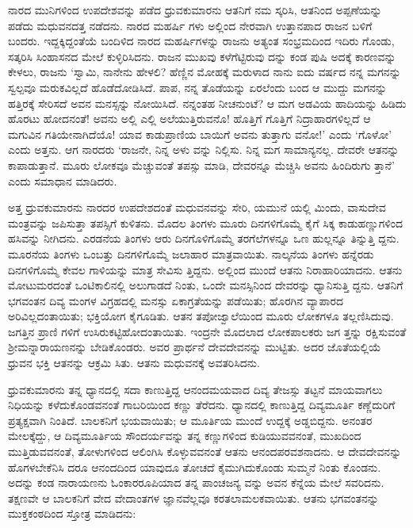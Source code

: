 ನಾರದ ಮುನಿಗಳಿಂದ ಉಪದೇಶವನ್ನು ಪಡೆದ ಧ್ರುವಕುಮಾರನು ಆತನಿಗೆ ನಮ ಸ್ಕರಿಸಿ, ಆತನಿಂದ ಅಪ್ಪಣೆಯನ್ನು ಪಡೆದು ಮಧುವನದತ್ತ ನಡೆದನು. ನಾರದ ಮಹರ್ಷಿ ಗಳು ಅಲ್ಲಿಂದ ನೇರವಾಗಿ ಉತ್ತಾನಪಾದ ರಾಜನ ಬಳಿಗೆ ಬಂದರು. ಇದ್ದಕ್ಕಿದ್ದಂತೆಯೆ ಬಂದಿಳಿದ ನಾರದ ಮಹರ್ಷಿಗಳನ್ನು ರಾಜನು ಅತ್ಯಂತ ಸಂಭ್ರಮದಿಂದ ಇದಿರು ಗೊಂಡು, ಸತ್ಕರಿಸಿ ಸಿಂಹಾಸನದ ಮೇಲೆ ಕುಳ್ಳಿರಿಸಿದನು. ರಾಜನ ಮುಖವು ಕಳೆಗೆಟ್ಟಿರುವು ದನ್ನು ಕಂಡ ಪುಷಿ ಅದಕ್ಕೆ ಕಾರಣವನ್ನು ಕೇಳಲು, ರಾಜನು ‘ಸ್ವಾಮಿ, ನಾನೇನು ಹೇಳಲಿ? ಹೆಣ್ಣಿನ ಮೋಹಕ್ಕೆ ಮರುಳಾದ ನಾನು ಐದು ವರ್ಷದ ನನ್ನ ಮಗನನ್ನು ಸ್ವಲ್ಪವೂ ಮರುಕವಿಲ್ಲದೆ ಹೊಡೆದೋಡಿಸಿದೆ. ಪಾಪ, ನನ್ನ ತೊಡೆಯನ್ನು ಏರಲೆಂದು ಬಂದ ಆ ಮುದ್ದು ಮಗನನ್ನು ಹತ್ತಿರಕ್ಕೆ ಸೇರಿಸದೆ ಅವನ ಮನಸ್ಸನ್ನು ನೋಯಿಸಿದೆ. ನನ್ನಂತಹ ನೀಚನುಂಟೆ? ಆ ಮಗ ಅಡವಿಯ ಹಾದಿಯನ್ನು ಹಿಡಿದು ಹೊರಟು ಹೋದನಂತೆ! ಅವನು ಅಲ್ಲಿ ಎಲ್ಲಿ ಅಲೆಯುತ್ತಿರುವನೊ! ಹೊತ್ತಿಗೆ ಗೊತ್ತಿಗೆ ನಿದ್ರಾಹಾರಗಳಿಲ್ಲದೆ ಆ ಮಗುವಿನ ಗತಿಯೇನಾಗಿದೆಯೊ! ಯಾವ ಕಾಡುಪ್ರಾಣಿಯ ಬಾಯಿಗೆ ಅವನು ತುತ್ತಾಗು ವನೋ!’ ಎಂದು ‘ಗೊಳೋ’ ಎಂದು ಅತ್ತನು. ಆಗ ನಾರದರು ‘ರಾಜನೇ, ನಿನ್ನ ಅಳು ವನ್ನು ನಿಲ್ಲಿಸು. ನಿನ್ನ ಮಗ ಸಾಮಾನ್ಯನಲ್ಲ. ದೇವರೇ ಆತನನ್ನು ಕಾಪಾಡುತ್ತಾನೆ. ಮೂರು ಲೋಕವೂ ಮೆಚ್ಚುವಂತೆ ತಪಸ್ಸು ಮಾಡಿ, ದೇವರನ್ನೂ ಮೆಚ್ಚಿಸಿ ಅವನು ಹಿಂದಿರುಗು ತ್ತಾನೆ’ ಎಂದು ಸಮಾಧಾನ ಮಾಡಿದರು.

ಅತ್ತ ಧ್ರುವಕುಮಾರನು ನಾರದರ ಉಪದೇಶದಂತೆ ಮಧುವನವನ್ನು ಸೇರಿ, ಯಮುನೆ ಯಲ್ಲಿ ಮಿಂದು, ವಾಸುದೇವ ಮಂತ್ರವನ್ನು ಜಪಿಸುತ್ತಾ ತಪಸ್ಸಿಗೆ ಕುಳಿತನು. ಮೊದಲ ತಿಂಗಳು ಮೂರು ದಿನಗಳಿಗೊಮ್ಮೆ ಕೈಗೆ ಸಿಕ್ಕ ಕಾಡುಹಣ್ಣುಗಳಿಂದ ಹಸಿವನ್ನು ನೀಗಿದನು. ಎರಡನೆಯ ತಿಂಗಳು ಆರು ದಿನಗೊಳಿಗೊಮ್ಮೆ ತರಗೆಲೆಗಳನ್ನೂ ಒಣ ಹುಲ್ಲನ್ನೂ ತಿನ್ನುತ್ತಿ ದ್ದನು. ಮೂರನೆಯ ತಿಂಗಳು ಒಂಬತ್ತು ದಿನಗಳಿಗೊಮ್ಮೆ ಜಲಾಹಾರ ಮಾತ್ರವಾಯಿತು. ನಾಲ್ಕನೆಯ ತಿಂಗಳು ಹನ್ನೆರಡು ದಿನಗಳಿಗೊಮ್ಮೆ ಕೇವಲ ಗಾಳಿಯನ್ನು ಮಾತ್ರ ಸೇವಿಸು ತ್ತಿದ್ದನು. ಅಲ್ಲಿಂದ ಮುಂದೆ ಆತನು ನಿರಾಹಾರಿಯಾದನು. ಆತನು ಮೋಟುಮರದಂತೆ ಒಂಟಿಕಾಲಿನಲ್ಲಿ ಅಲುಗಾಡದೆ ನಿಂತು, ಒಂದೇ ಮನಸ್ಸಿನಿಂದ ದೇವರನ್ನು ಧ್ಯಾನಿಸುತ್ತಿ ದ್ದನು. ಆತನಿಗೆ ಭಗವಂತನ ದಿವ್ಯ ಮಂಗಳ ವಿಗ್ರಹದಲ್ಲಿ ಮನಸ್ಸು ಏಕಾಗ್ರತೆಯನ್ನು ಪಡೆಯಿತು; ಹೊರಗಿನ ವ್ಯಾಪಾರದ ಅರಿವಿಲ್ಲದಂತಾಯಿತು; ಭಕ್ತಿಯೋಗ ಕೈಗೂಡಿತು. ಆತನ ತಪೋಜ್ವಾಲೆಯಿಂದ ಮೂರು ಲೋಕಗಳೂ ತಲ್ಲಣಿಸಿದುವು. ಜಗತ್ತಿನ ಪ್ರಾಣಿ ಗಳಿಗೆ ಉಸಿರುಕಟ್ಟಿಹೋದಂತಾಯಿತು. ಇಂದ್ರನೇ ಮೊದಲಾದ ಲೋಕಪಾಲಕರು ಜಗ ತ್ತನ್ನು ರಕ್ಷಿಸುವಂತೆ ಶ್ರೀಮನ್ನಾರಾಯಣನನ್ನು ಬೇಡಿಕೊಂಡರು. ಅವರ ಪ್ರಾರ್ಥನೆ ದೇವದೇವನನ್ನು ಮುಟ್ಟಿತು. ಅದರ ಜೊತೆಯಲ್ಲಿಯೆ ಧ್ರುವನ ಭಕ್ತಿ ಆತನನ್ನು ಆಕ್ರಮಿ ಸಿತು. ಆತನು ಮಧುವನಕ್ಕೆ ಅವತರಿಸಿದನು.

ಧ್ರುವಕುಮಾರನು ತನ್ನ ಧ್ಯಾನದಲ್ಲಿ ಸದಾ ಕಾಣುತ್ತಿದ್ದ ಆನಂದಮಯವಾದ ದಿವ್ಯ ತೇಜಸ್ಸು ತಟ್ಟನೆ ಮಾಯವಾಗಲು ನಿಧಿಯನ್ನು ಕಳೆದುಕೊಂಡವನಂತೆ ಗಾಬರಿಯಿಂದ ಕಣ್ಣು ತೆರೆದನು. ಧ್ಯಾನದಲ್ಲಿ ಕಾಣುತ್ತಿದ್ದ ದಿವ್ಯಮೂರ್ತಿ ಕಣ್ಣೆದುರಿಗೆ ಪ್ರತ್ಯಕ್ಷವಾಗಿ ನಿಂತಿದೆ. ಬಾಲಕನಿಗೆ ಭಯವಾಯಿತು; ಆ ಮೂರ್ತಿಯ ಮುಂದೆ ಉದ್ದಕ್ಕೆ ಅಡ್ಡಬಿದ್ದನು. ಅನಂತರ ಮೇಲಕ್ಕೆದ್ದು, ಆ ದಿವ್ಯಮೂರ್ತಿಯ ಸೌಂದರ್ಯವನ್ನು ತನ್ನ ಕಣ್ಣುಗಳಿಂದ ಕುಡಿಯುವವನಂತೆ, ಮುಖದಿಂದ ಮುತ್ತಿಡುವವನಂತೆ, ತೋಳುಗಳಿಂದ ಆಲಿಂಗಿಸಿ ಕೊಳ್ಳುವವನಂತೆ ಆತನು ಆನಂದಪರವಶನಾದನು. ಆ ದೇವದೇವನನ್ನು ಹೊಗಳಬೇಕೆನಿಸಿ ದರೂ ಆನಂದದಿಂದ ಯಾವುದೂ ತೋಚದೆ ಕೈಮುಗಿದುಕೊಂಡು ಸುಮ್ಮನೆ ನಿಂತು ಕೊಂಡನು. ಅದನ್ನು ಕಂಡ ನಾರಾಯಣನು ಓಂಕಾರರೂಪಿಯಾದ ತನ್ನ ಪಾಂಚಜನ್ಯ ವನ್ನು ಅವನ ಕೆನ್ನೆಯ ಮೇಲೆ ಸವರಿದನು. ತಕ್ಷಣವೇ ಆ ಬಾಲಕನಿಗೆ ವೇದ ವೇದಾಂತಗಳ ಜ್ಞಾನವೆಲ್ಲವೂ ಕರತಲಾಮಲಕವಾಯಿತು. ಆತನು ಭಗವಂತನನ್ನು ಮುಕ್ತಕಂಠದಿಂದ ಸ್ತೋತ್ರ ಮಾಡಿದನು:


